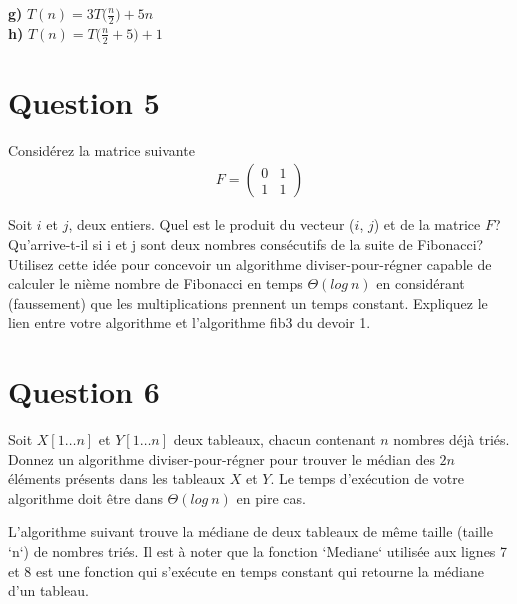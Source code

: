 \documentclass[12pt]{article}
\begin{document}
\textbf{g) } \(T(n)=3T\big(\frac{n}{2}\big)+5n\) \\

\textbf{h) } \(T(n)=T\big(\frac{n}{2}+5\big)+1\) \\

\newpage

\section*{Question 5}
Considérez la matrice suivante
\begin{align*}
	F = 
	\begin{pmatrix}
		0 & 1 \\
		1 & 1 
	\end{pmatrix}
\end{align*}

Soit \(i\) et \(j\), deux entiers. Quel est le produit du vecteur (\(i\), \(j\)) et de la matrice \(F\)? Qu’arrive-t-il si i et j sont deux nombres consécutifs de la suite de Fibonacci? Utilisez cette idée pour concevoir un algorithme diviser-pour-régner capable de calculer le nième nombre de Fibonacci en temps \(\Theta (log \: n)\) en considérant (faussement) que les multiplications
prennent un temps constant. Expliquez le lien entre votre algorithme et l’algorithme fib3 du devoir 1.

\newpage

\section*{Question 6}
Soit \(X[1 \dots n]\) et \(Y [1 \dots n]\) deux tableaux, chacun contenant \(n\) nombres déjà triés. Donnez un algorithme diviser-pour-régner pour trouver le médian des \(2n\) éléments présents dans les tableaux \(X\) et \(Y\). Le temps d’exécution de votre algorithme doit être dans \(\Theta (log \: n)\) en pire cas.

\begin{flushleft}
L'algorithme suivant trouve la médiane de deux tableaux de même taille (taille `n`) de nombres triés. Il est à noter que la fonction `Mediane` utilisée aux lignes 7 et 8 est une fonction qui s'exécute en temps constant qui retourne la médiane d'un tableau.
\end{flushleft}
\end{document}
